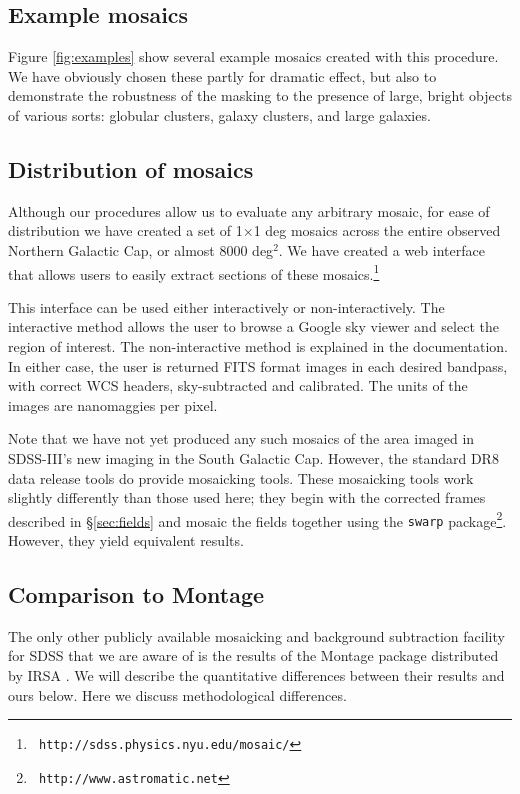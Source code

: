 \documentclass[10pt,preprint]{aastex}
\begin{document}
\subsection{Example mosaics}

Figure \ref{fig:examples} show several example mosaics created with
this procedure.  We have obviously chosen these partly for dramatic
effect, but also to demonstrate the robustness of the masking to the
presence of large, bright objects of various sorts: globular clusters,
galaxy clusters, and large galaxies.

\subsection{Distribution of mosaics}
\label{sec:distmosaic}

Although our procedures allow us to evaluate any arbitrary mosaic, for
ease of distribution we have created a set of 1$\times$1 deg mosaics
across the entire observed Northern Galactic Cap, or almost 8000
deg$^2$. We have created a web interface that allows users to easily
extract sections of these mosaics.\footnote{\tt
http://sdss.physics.nyu.edu/mosaic/}

This interface can be used either interactively or
non-interactively. The interactive method allows the user to browse a
Google sky viewer and select the region of interest.  The
non-interactive method is explained in the documentation.  In either
case, the user is returned FITS format images in each desired
bandpass, with correct WCS headers, sky-subtracted and calibrated. The
units of the images are nanomaggies per pixel.

Note that we have not yet produced any such mosaics of the area imaged
in SDSS-III's new imaging in the South Galactic Cap. However, the
standard DR8 data release tools do provide mosaicking tools. These
mosaicking tools work slightly differently than those used here; they
begin with the corrected frames described in \S\ref{sec:fields} and
mosaic the fields together using the {\tt swarp} package\footnote{{\tt
    http://www.astromatic.net}}. However, they yield equivalent
results.

\subsection{Comparison to Montage}

The only other publicly available mosaicking and background
subtraction facility for SDSS that we are aware of is the results of
the Montage package distributed by IRSA
\citep{berriman03a,berriman04a}. We will describe the quantitative
differences between their results and ours below.  Here we discuss
methodological differences.
\end{document}
